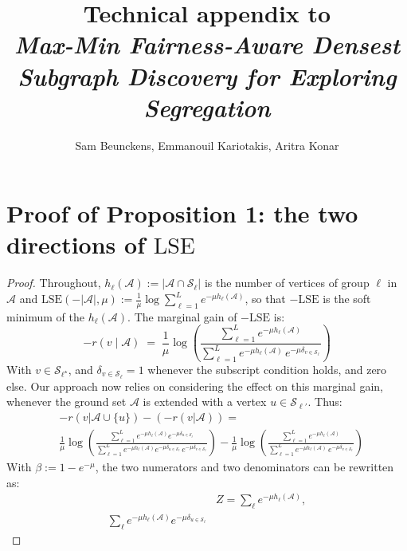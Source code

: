\documentclass{article}
\def \setA{\mathcal{A}}
\def \setS{\mathcal{S}}
\def \LSE{\mathrm{LSE}}
\begin{document}
\title{Technical appendix to\\ \emph{Max-Min Fairness-Aware Densest Subgraph Discovery for Exploring Segregation}}
\author{Sam Beunckens, Emmanouil Kariotakis, Aritra Konar}
\date{}
\maketitle
\section{Proof of Proposition 1: the two directions of $\LSE$}
\begin{proof}
    \label{app:bidirectional}
	Throughout, $h_\ell(\setA) := |\setA \cap \setS_\ell|$ is the number of vertices of group $\ell$ in $\setA$ and $\LSE(-|\setA|,\mu) := \frac{1}{\mu}\log\sum_{\ell=1}^{L} e^{-\mu h_\ell(\setA)}$, so that $-\LSE$ is the soft minimum of the $h_\ell(\setA)$. The marginal gain of $-\LSE$ is:
	\begin{equation*}
		-r(v \mid \setA)
		\;=\; \frac{1}{\mu}\log\!\left(
		\frac{\sum_{\ell=1}^{L} e^{-\mu h_\ell(\setA)}}
		{\sum_{\ell=1}^{L} e^{-\mu h_\ell(\setA)} \, e^{-\mu \delta_{v \in \setS_\ell}}}
		\right)
	\end{equation*}
    With $v\in \setS_{\ell^\star}$, and $\delta_{v \in \setS_\ell}=1$ whenever the subscript condition holds, and zero else. Our approach now relies on considering the effect on this marginal gain, whenever the ground set $\setA$ is extended with a vertex $u \in \setS_{\ell'}$. Thus:
    \begin{align}
        &-r(v|\setA\cup \{u\}) - (-r(v|\setA)) =\\
        &\frac{1}{\mu}\log\!\left(
		\frac{\sum_{\ell=1}^{L} e^{-\mu h_\ell(\setA)}e^{-\mu \delta_{u \in \setS_\ell}}}
		{\sum_{\ell=1}^{L} e^{-\mu h_\ell(\setA)} e^{-\mu \delta_{u \in \setS_\ell}} \, e^{-\mu \delta_{v \in \setS_\ell}}}
		\right) - \frac{1}{\mu}\log\!\left(
		\frac{\sum_{\ell=1}^{L} e^{-\mu h_\ell(\setA)}}
		{\sum_{\ell=1}^{L} e^{-\mu h_\ell(\setA)} \, e^{-\mu \delta_{v \in \setS_\ell}}}
		\right)
    \end{align}
     With $\beta := 1-e^{-\mu}$, the two numerators and two denominators can be rewritten as:
    \begin{equation}
    \label{eq:simplificationZ}
    \begin{aligned}
    & Z = \sum_\ell e^{-\mu h_\ell(\setA)},\\
	\sum_{\ell} e^{-\mu h_\ell(\setA)} e^{-\mu \delta_{u \in \setS_\ell}}

\end{aligned}
\end{equation}
\end{proof}
\end{document}
